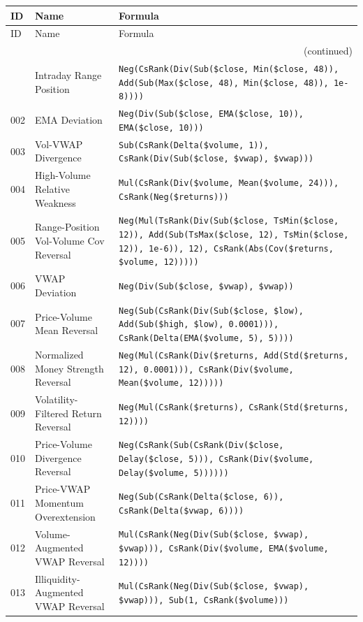 \begingroup
\setlength{\LTpre}{0pt}
\setlength{\LTpost}{0pt}
\scriptsize
\renewcommand{\arraystretch}{1.1}
\begin{longtable}{@{}llp{}@{}}
\toprule
ID & Name & Formula \\
\midrule
\endfirsthead
\toprule
ID & Name & Formula \\
\midrule
\endhead
\midrule
\multicolumn{3}{r}{(continued)} \\
\endfoot
\bottomrule
\endlastfoot
001 & Intraday Range Position & \texttt{Neg(CsRank(Div(Sub(\$close, Min(\$close, 48)), Add(Sub(Max(\$close, 48), Min(\$close, 48)), 1e-8))))} \\
002 & EMA Deviation & \texttt{Neg(Div(Sub(\$close, EMA(\$close, 10)), EMA(\$close, 10)))} \\
003 & Vol-VWAP Divergence & \texttt{Sub(CsRank(Delta(\$volume, 1)), CsRank(Div(Sub(\$close, \$vwap), \$vwap)))} \\
004 & High-Volume Relative Weakness & \texttt{Mul(CsRank(Div(\$volume, Mean(\$volume, 24))), CsRank(Neg(\$returns)))} \\
005 & Range-Position Vol-Volume Cov Reversal & \texttt{Neg(Mul(TsRank(Div(Sub(\$close, TsMin(\$close, 12)), Add(Sub(TsMax(\$close, 12), TsMin(\$close, 12)), 1e-6)), 12), CsRank(Abs(Cov(\$returns, \$volume, 12)))))} \\
006 & VWAP Deviation & \texttt{Neg(Div(Sub(\$close, \$vwap), \$vwap))} \\
007 & Price-Volume Mean Reversal & \texttt{Neg(Sub(CsRank(Div(Sub(\$close, \$low), Add(Sub(\$high, \$low), 0.0001))), CsRank(Delta(EMA(\$volume, 5), 5))))} \\
008 & Normalized Money Strength Reversal & \texttt{Neg(Mul(CsRank(Div(\$returns, Add(Std(\$returns, 12), 0.0001))), CsRank(Div(\$volume, Mean(\$volume, 12)))))} \\
009 & Volatility-Filtered Return Reversal & \texttt{Neg(Mul(CsRank(\$returns), CsRank(Std(\$returns, 12))))} \\
010 & Price-Volume Divergence Reversal & \texttt{Neg(CsRank(Sub(CsRank(Div(\$close, Delay(\$close, 5))), CsRank(Div(\$volume, Delay(\$volume, 5))))))} \\
011 & Price-VWAP Momentum Overextension & \texttt{Neg(Sub(CsRank(Delta(\$close, 6)), CsRank(Delta(\$vwap, 6))))} \\
012 & Volume-Augmented VWAP Reversal & \texttt{Mul(CsRank(Neg(Div(Sub(\$close, \$vwap), \$vwap))), CsRank(Div(\$volume, EMA(\$volume, 12))))} \\
013 & Illiquidity-Augmented VWAP Reversal & \texttt{Mul(CsRank(Neg(Div(Sub(\$close, \$vwap), \$vwap))), Sub(1, CsRank(\$volume)))} \\

\end{longtable}

